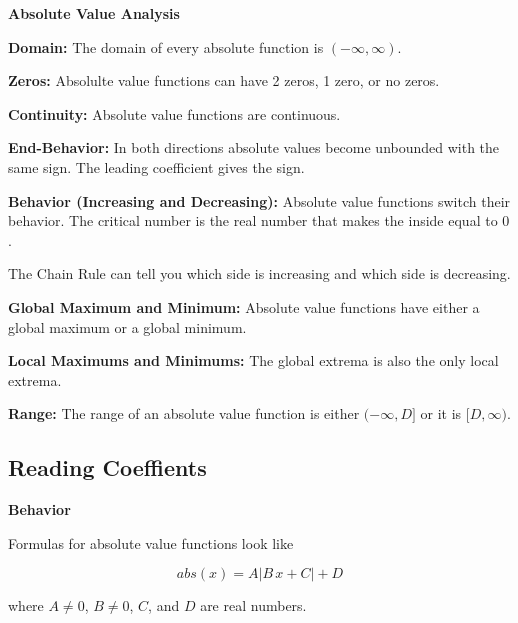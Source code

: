 \documentclass{ximera}
\begin{document}
\begin{summary}\textbf{\textcolor{red!70!yellow}{Absolute Value Analysis}}


\textbf{Domain:} The domain of every absolute function is $(-\infty, \infty)$.

\textbf{Zeros:} Absolulte value functions can have 2 zeros, 1 zero, or no zeros.

\textbf{Continuity:} Absolute value functions are continuous.

\textbf{End-Behavior:} In both directions absolute values become unbounded with the same sign.  The leading coefficient gives the sign.






\textbf{Behavior (Increasing and Decreasing):} Absolute value functions switch their behavior. The critical number is the real number that makes the inside equal to $0$.

The Chain Rule can tell you which side is increasing and which side is decreasing.

\textbf{Global Maximum and Minimum:}  Absolute value functions have either a global maximum or a global minimum.

\textbf{Local Maximums and Minimums:} The global extrema is also the only local extrema.

\textbf{Range:} The range of an absolute value function is either $(-\infty, D]$ or it is $[D, \infty)$.



\end{summary}




















\subsection*{Reading Coeffients}



\textbf{Behavior}


Formulas for absolute value functions look like

\[     abs(x) =    A  | B \, x + C | + D           \]

where $A \ne 0$, $B \ne 0$, $C$, and $D$ are real numbers.
\end{document}
